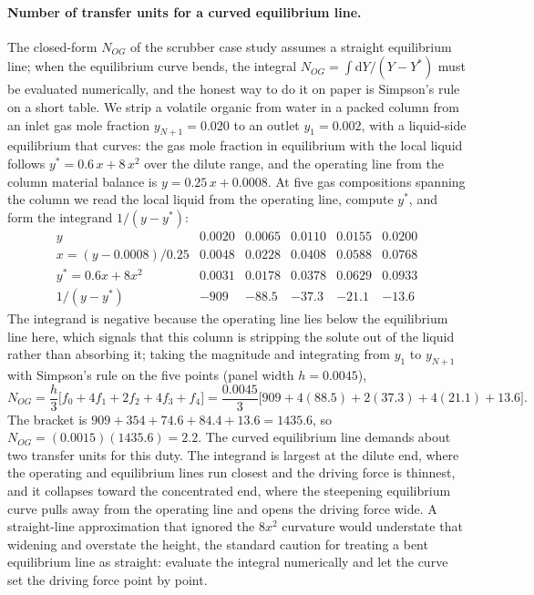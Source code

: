 \paragraph{Number of transfer units for a curved equilibrium line.} The
closed-form $N_{OG}$ of the scrubber case study assumes a straight
equilibrium line; when the equilibrium curve bends, the integral
$N_{OG} = \int \mathrm{d}Y/(Y - Y^{*})$ must be evaluated numerically, and
the honest way to do it on paper is Simpson's rule on a short table. We
strip a volatile organic from water in a packed column from an inlet gas
mole fraction $y_{N+1} = 0.020$ to an outlet $y_1 = 0.002$, with a
liquid-side equilibrium that curves: the gas mole fraction in equilibrium
with the local liquid follows $y^{*} = 0.6\,x + 8\,x^2$ over the dilute
range, and the operating line from the column material balance is
$y = 0.25\,x + 0.0008$. At five gas compositions spanning the column we
read the local liquid from the operating line, compute $y^{*}$, and form
the integrand $1/(y - y^{*})$:
\[
\begin{array}{lccccc}
y & 0.0020 & 0.0065 & 0.0110 & 0.0155 & 0.0200\\
x = (y-0.0008)/0.25 & 0.0048 & 0.0228 & 0.0408 & 0.0588 & 0.0768\\
y^{*} = 0.6x + 8x^2 & 0.0031 & 0.0178 & 0.0378 & 0.0629 & 0.0933\\
1/(y - y^{*}) & {-909} & {-88.5} & {-37.3} & {-21.1} & {-13.6}
\end{array}
\]
The integrand is negative because the operating line lies below the
equilibrium line here, which signals that this column is stripping the
solute out of the liquid rather than absorbing it; taking the magnitude and
integrating from $y_1$ to $y_{N+1}$ with Simpson's rule on the five points
(panel width $h = 0.0045$),
\[
N_{OG} = \frac{h}{3}\big[f_0 + 4f_1 + 2f_2 + 4f_3 + f_4\big] =
\frac{0.0045}{3}\big[909 + 4(88.5) + 2(37.3) + 4(21.1) + 13.6\big].
\]
The bracket is $909 + 354 + 74.6 + 84.4 + 13.6 = 1435.6$, so
$N_{OG} = (0.0015)(1435.6) = 2.2$. The curved equilibrium line demands
about two transfer units for this duty. The integrand is largest at the
dilute end, where the operating and equilibrium lines run closest and the
driving force is thinnest, and it collapses toward the concentrated end,
where the steepening equilibrium curve pulls away from the operating line
and opens the driving force wide. A straight-line approximation that
ignored the $8x^2$ curvature would understate that widening and overstate
the height, the standard caution for treating a bent equilibrium line as
straight: evaluate the integral numerically and let the curve set the
driving force point by point.

